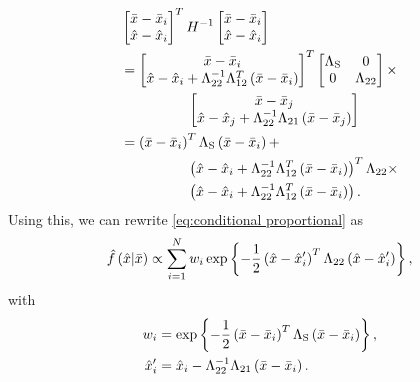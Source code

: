 \begin{align*}
	&\begin{bmatrix} 
		\variableparta - \datapointparta{\indexdata} \\ 
		\variablepartb - \datapointpartb{\indexdata} 
	\end{bmatrix}^T 
	\bandwidthmatrix^{-1}
	\begin{bmatrix} 
		\variableparta - \datapointparta{\indexdata} \\ 
		\variablepartb - \datapointpartb{\indexdata} 
	\end{bmatrix} \\
	&= \begin{bmatrix} 
		\variableparta - \datapointparta{\indexdata} \\ 
		\variablepartb - \datapointpartb{\indexdata} + \bwibr^{-1} \bwiur^T \left(\variableparta - \datapointparta{\indexdata} \right)
	\end{bmatrix}^T 
	\begin{bmatrix} 
		\bwischur  & 0 \\ 
		0 & \bwibr 
	\end{bmatrix} \times \\
	&\superquad \begin{bmatrix}
		\variableparta - \datapointparta{\indexsampling} \\
		\variablepartb - \datapointpartb{\indexsampling} + \bwibr^{-1}\bwibl \left(\variableparta - \datapointparta{\indexsampling} \right)
	\end{bmatrix} \\
	&= \left(\variableparta - \datapointparta{\indexdata}\right)^T 
	\bwischur 
	\left(\variableparta - \datapointparta{\indexdata}\right) + \nonumber \\
	&\superquad \left( \variablepartb - \datapointpartb{\indexdata} + \bwibr^{-1} \bwiur^T \left(\variableparta - \datapointparta{\indexdata} \right) \right)^T
	\bwibr \times \\
	&\superquad \left( \variablepartb - \datapointpartb{\indexdata} + \bwibr^{-1} \bwiur^T \left(\variableparta - \datapointparta{\indexdata} \right) \right).
\end{align*}
Using this, we can rewrite \cref{eq:conditional proportional} as
\begin{equation}
	\label{eq:final conditional hard}
	\hat{f}\left(  \hat{x} | \bar{x}  \right) 
	\propto \sum_{i=1}^{N} w_{i}
	\exp\left\{  -\frac{1}{2} \left( \hat{x} - \hat{x}_{i}' \right)^T \Lambda_{22} \left( \hat{x} - \hat{x}_{i}' \right) \right\},
\end{equation}
with
\begin{align}
	\label{eq:weights conditional hard}
	w_{i} &= \exp\left\{ 
		-\frac{1}{2} \left(\bar{x} - \bar{x}_{i}\right)^T 
		\Lambda_{\mathrm{S}}
		\left(\bar{x} - \bar{x}_{i}\right) \right\}, \\
	\label{eq:offset conditional hard}
	\hat{x}_{i}' &= \hat{x}_{i} - \Lambda_{22}^{-1}\Lambda_{21} \left(\bar{x} - \bar{x}_{i} \right).
\end{align}

